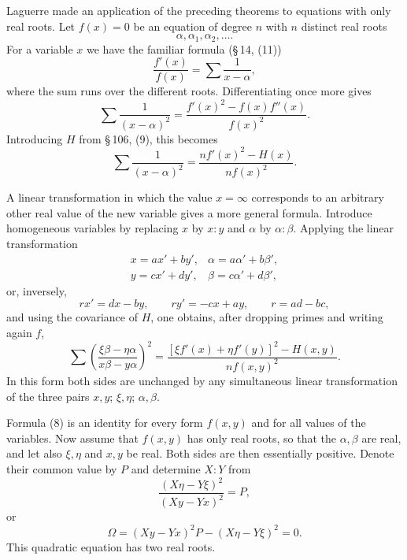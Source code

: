 \documentclass[11pt]{article}
\begin{document}
Laguerre made an application of the preceding theorems to equations with only real roots. Let $f(x)=0$ be an equation of degree $n$ with $n$ distinct real roots
\[
        \alpha,\alpha_1,\alpha_2,\ldots .
\]
For a variable $x$ we have the familiar formula (\S\,14, (11))
\begin{equation}
        \frac{f'(x)}{f(x)}=\sum\frac1{x-\alpha},
\tag{1}
\end{equation}
where the sum runs over the different roots. Differentiating once more gives
\begin{equation}
        \sum\frac1{(x-\alpha)^2}
        =\frac{f'(x)^2-f(x)f''(x)}{f(x)^2}.
\tag{2}
\end{equation}
Introducing $H$ from \S\,106, (9), this becomes
\begin{equation}
        \sum\frac1{(x-\alpha)^2}
        =\frac{n f'(x)^2-H(x)}{n f(x)^2}.
\tag{3}
\end{equation}

A linear transformation in which the value $x=\infty$ corresponds to an arbitrary other real value of the new variable gives a more general formula. Introduce homogeneous variables by replacing $x$ by $x:y$ and $\alpha$ by $\alpha:\beta$. Applying the linear transformation
\begin{equation}
\begin{array}{ll}
x=ax'+by',& \alpha=a\alpha'+b\beta',\\
y=cx'+dy',& \beta=c\alpha'+d\beta',
\end{array}
\tag{5}
\end{equation}
or, inversely,
\[
        rx'=dx-by,\qquad ry'=-cx+ay,\qquad r=ad-bc,
\]
and using the covariance of $H$, one obtains, after dropping primes and writing again $f$,
\begin{equation}
        \sum\left(
        \frac{\xi\beta-\eta\alpha}{x\beta-y\alpha}
        \right)^2
        =
        \frac{[\xi f'(x)+\eta f'(y)]^2-H(x,y)}{n f(x,y)^2}.
\tag{8}
\end{equation}
In this form both sides are unchanged by any simultaneous linear transformation of the three pairs $x,y$; $\xi,\eta$; $\alpha,\beta$.

Formula (8) is an identity for every form $f(x,y)$ and for all values of the variables. Now assume that $f(x,y)$ has only real roots, so that the $\alpha,\beta$ are real, and let also $\xi,\eta$ and $x,y$ be real. Both sides are then essentially positive. Denote their common value by $P$ and determine $X:Y$ from
\[
        \frac{(X\eta-Y\xi)^2}{(Xy-Yx)^2}=P,
\]
or
\begin{equation}
        \Omega=(Xy-Yx)^2P-(X\eta-Y\xi)^2=0.
\tag{9}
\end{equation}
This quadratic equation has two real roots.
\end{document}
